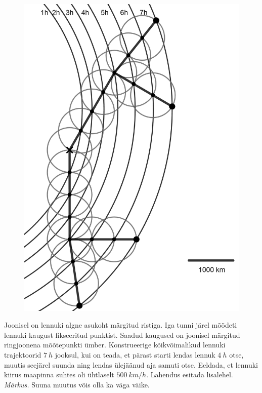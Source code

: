 \documentclass[10pt]{article}
\begin{document}
\begin{figure}
  \vspace{-28pt}
  \begin{center}
  \includegraphics[scale=0.2]{2019-v3g-03-yl.png}
  \end{center}
  \vspace{-20pt}
\end{figure}


Joonisel on lennuki algne asukoht märgitud ristiga. Iga tunni järel mõõdeti lennuki kaugust fikseeritud punktist. Saadud kaugused on joonisel märgitud ringjoonena mõõtepunkti ümber. Konstrueerige kõikvõimalikud lennuki trajektoorid $\SI{7}{h}$ jooksul, kui on teada, et pärast starti lendas lennuk $\SI{4}{h}$ otse, muutis seejärel suunda ning lendas ülejäänud aja samuti otse. Eeldada, et lennuki kiirus maapinna suhtes oli ühtlaselt $\SI{500}{km/h}$. Lahendus esitada lisalehel.
\textit{Märkus.} Suuna muutus võis olla ka väga väike.
\probend
\bigskip
\end{document}
